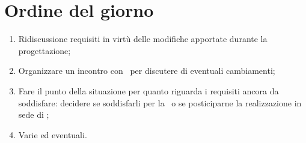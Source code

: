\documentclass[../AnalisiDeiRequisiti.tex]{subfiles}
\begin{document}
	\section*{Ordine del giorno}
		\begin{enumerate}
			\item Ridiscussione requisiti in virtù delle modifiche apportate durante la progettazione;
			\item Organizzare un incontro con \proponente\ per discutere di eventuali cambiamenti;
			\item Fare il punto della situazione per quanto riguarda i requisiti ancora da soddisfare: decidere se soddisfarli per la \revisionediqualifica\ o se posticiparne la realizzazione in sede di \revisionediaccettazione;
			\item Varie ed eventuali.
		\end{enumerate}
\end{document}
